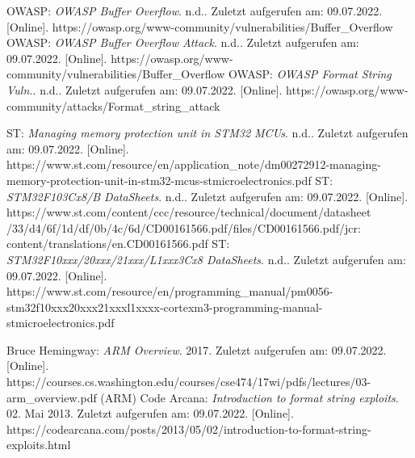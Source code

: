 \documentclass[a4paper,
DIV=13,
12pt,
BCOR=10mm,
department=FakIM,
oneside,
parskip=half,
automark,
listof=totocnumbered,
bibliography=totocnumbered,
acronym=totocnumbered
] {OTHRartcl}
\begin{document}
\begin{appendix}
\begin{thebibliography}{99}
  OWASP: \textit{OWASP Buffer Overflow}. n.d.. Zuletzt aufgerufen am: 09.07.2022. [Online]. https://owasp.org/www-community/vulnerabilities/Buffer\_Overflow
  OWASP: \textit{OWASP Buffer Overflow Attack}. n.d.. Zuletzt aufgerufen am: 09.07.2022. [Online]. https://owasp.org/www-community/vulnerabilities/Buffer\_Overflow
  OWASP: \textit{OWASP Format String Vuln.}. n.d.. Zuletzt aufgerufen am: 09.07.2022. [Online]. https://owasp.org/www-community/attacks/Format\_string\_attack

  ST: \textit{Managing memory protection unit in STM32 MCUs}. n.d.. Zuletzt aufgerufen am: 09.07.2022. [Online]. https://www.st.com/resource/en/application\_note/dm00272912-managing-memory-protection-unit-in-stm32-mcus-stmicroelectronics.pdf
  ST: \textit{STM32F103Cx8/B DataSheets}. n.d.. Zuletzt aufgerufen am: 09.07.2022. [Online]. \\https://www.st.com/content/ccc/resource/technical/document/datasheet /33/d4/6f/1d/df/0b/4c/6d/CD00161566.pdf/files/CD00161566.pdf/jcr: content/translations/en.CD00161566.pdf
  ST: \textit{STM32F10xxx/20xxx/21xxx/L1xxx3Cx8 DataSheets}. n.d.. Zuletzt aufgerufen am: 09.07.2022. [Online]. https://www.st.com/resource/en/programming\_manual/pm0056-stm32f10xxx20xxx21xxxl1xxxx-cortexm3-programming-manual-stmicroelectronics.pdf

  Bruce Hemingway: \textit{ARM Overview}. 2017. Zuletzt aufgerufen am: 09.07.2022. [Online]. https://courses.cs.washington.edu/courses/cse474/17wi/pdfs/lectures/03-arm\_overview.pdf (ARM)
  Code Arcana: \textit{Introduction to format string exploits}. 02. Mai 2013. Zuletzt aufgerufen am: 09.07.2022. [Online]. https://codearcana.com/posts/2013/05/02/introduction-to-format-string-exploits.html


\end{thebibliography}
\end{appendix}
\end{document}
